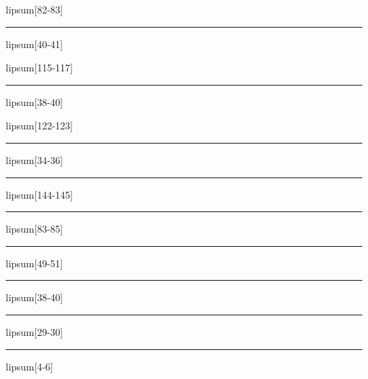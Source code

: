 \documentclass[11pt,a4paper]{article}
\begin{document}
lipsum[82-83]

\begin{simplewrap}
  \textcolor{magenta!46}{\rule{3.4cm}{6.0cm}}
\end{simplewrap}
lipsum[40-41]

lipsum[115-117]

\begin{simplewrap}
  \textcolor{cyan!15}{\rule{3.7cm}{4.3cm}}
\end{simplewrap}
lipsum[38-40]

lipsum[122-123]

\begin{simplewrap}
  \textcolor{blue!45}{\rule{4.2cm}{2.7cm}}
\end{simplewrap}
lipsum[34-36]

\begin{simplewrap}
  \textcolor{red!45}{\rule{3.6cm}{5.2cm}}
\end{simplewrap}
lipsum[144-145]

\begin{simplewrap}
  \textcolor{cyan!25}{\rule{3.7cm}{4.1cm}}
\end{simplewrap}
lipsum[83-85]

\begin{simplewrap}
  \textcolor{green!17}{\rule{5.0cm}{5.4cm}}
\end{simplewrap}
lipsum[49-51]

\begin{simplewrap}
  \textcolor{red!59}{\rule{3.9cm}{9.9cm}}
\end{simplewrap}
lipsum[38-40]

\begin{simplewrap}
  \textcolor{magenta!22}{\rule{5.1cm}{3.2cm}}
\end{simplewrap}
lipsum[29-30]

\begin{simplewrap}
  \textcolor{magenta!49}{\rule{5.8cm}{9.0cm}}
\end{simplewrap}
lipsum[4-6]
\end{document}
